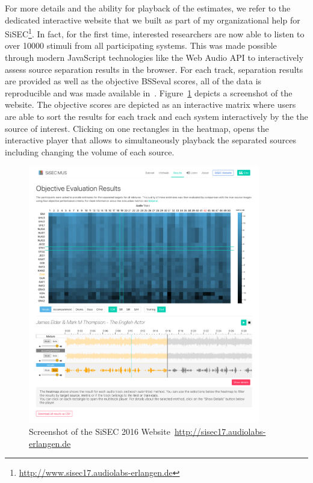 For more details and the ability for playback of the estimates, we refer to the dedicated interactive website that we built as part of my organizational help for SiSEC\footnote{\url{http://www.sisec17.audiolabs-erlangen.de}}.
In fact, for the first time, interested researchers are now able to listen to over 10000 stimuli from all participating systems.
This was made possible through modern JavaScript technologies like the Web Audio API to interactively assess source separation results in the browser.
For each track, separation results are provided as well as the objective BSSeval scores, all of the data is reproducible and was made available in~\cite{oss_sisecwebsite}.
Figure~\ref{fig:sisec_website} depicts a screenshot of the website.
The objective scores are depicted as an interactive matrix where users are able to sort the results for each track and each system interactively by the the source of interest.
Clicking on one rectangles in the heatmap, opens the interactive player that allows to simultaneously playback the separated sources including changing the volume of each source.

\begin{figure}[!h]
\centering
\includegraphics[width=0.9\textwidth]{Chapters/06_Separation_Unknown/figures/sisec_website.png}
\caption{Screenshot of the SiSEC 2016 Website~\url{http://sisec17.audiolabs-erlangen.de}}
\label{fig:sisec_website}

\end{figure}

